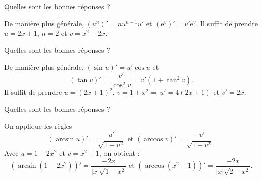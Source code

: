 \begin{question}
Quelles sont les bonnes réponses ?
\begin{answers}  
\end{answers}
\begin{explanations}
De manière plus générale, $(u^n)'=nu^{n-1}u'$ et $(\mathrm{e}^v)'=v'\mathrm{e}^v$. Il suffit de prendre $u=2x+1$, $n=2$ et $v=x^2-2x$.
\end{explanations}
\end{question}


\begin{question}
Quelles sont les bonnes réponses ?
\begin{answers}  
\end{answers}
\begin{explanations}
De manière plus générale, $(\sin u)'=u'\cos u$ et 
$$(\tan v)'=\frac{v'}{\cos ^2v}=v'(1+\tan ^2v).$$
Il suffit de prendre $u=(2x+1)^2$, $v=1+x^2\Rightarrow u'=4(2x+1)$ et $v'=2x$.
\end{explanations}
\end{question}




\begin{question}
Quelles sont les bonnes réponses ?
\begin{answers}
\end{answers}
\begin{explanations}
On applique les règles
$$(\arcsin u)'=\frac{u'}{\sqrt{1-u^2}}\mbox{ et }(\arccos v)'=\frac{-v'}{\sqrt{1-v^2}}.$$
Avec $u=1-2x^2$ et $v=x^2-1$, on obtient :
$$(\arcsin (1-2x^2))'=\frac{-2x}{|x|\sqrt{1-x^2}}\mbox{ et }(\arccos (x^2-1))'=\frac{-2x}{|x|\sqrt{2-x^2}}.$$
\end{explanations}
\end{question}




